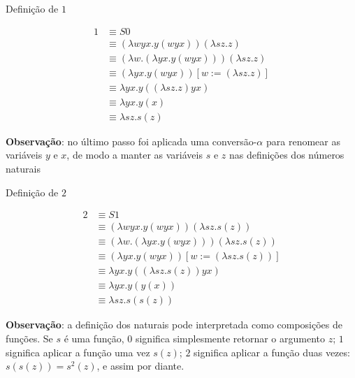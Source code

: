 \begin{frame}[fragile]{Definição de $1$}

    \begin{align*}
        1 &\equiv S0 \\
          &\equiv (\lambda wyx.y(wyx))(\lambda sz.z) \\
          &\equiv (\lambda w.(\lambda yx.y(wyx)))(\lambda sz.z) \\
          &\equiv (\lambda yx.y(wyx))[w:=(\lambda sz.z)] \\
          &\equiv \lambda yx.y((\lambda sz.z)yx) \\
          &\equiv \lambda yx.y(x) \\
          &\equiv \lambda sz.s(z)
    \end{align*}

    \vspace{0.1in}

    \textbf{Observação}: no último passo foi aplicada uma conversão-$\alpha$ para renomear
        as variáveis $y$ e $x$, de modo a manter as variáveis $s$ e $z$ nas definições dos
        números naturais
\end{frame}

\begin{frame}[fragile]{Definição de $2$}

    \begin{align*}
        2 &\equiv S1 \\
          &\equiv (\lambda wyx.y(wyx))(\lambda sz.s(z)) \\
          &\equiv (\lambda w.(\lambda yx.y(wyx)))(\lambda sz.s(z)) \\
          &\equiv (\lambda yx.y(wyx))[w:=(\lambda sz.s(z))] \\
          &\equiv \lambda yx.y((\lambda sz.s(z))yx) \\
          &\equiv \lambda yx.y(y(x)) \\
          &\equiv \lambda sz.s(s(z))
    \end{align*}

    \vspace{0.1in}

    \textbf{Observação}: a definição dos naturais pode interpretada como composições de funções.
        Se $s$ é uma função, $0$ significa simplesmente retornar o argumento $z$; $1$ 
        significa aplicar a função uma vez $s(z)$; $2$ significa aplicar a função duas vezes:
        $s(s(z)) = s^2(z)$, e assim por diante. 
\end{frame}
